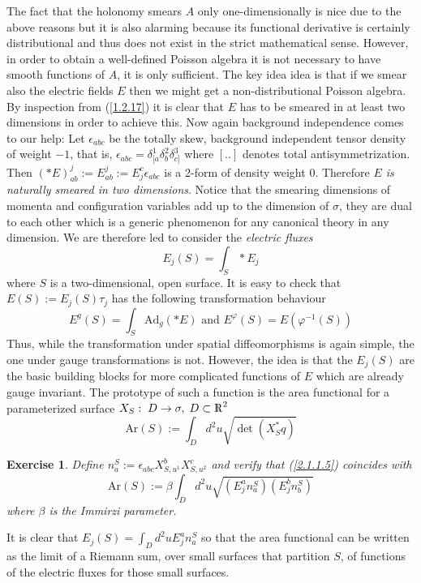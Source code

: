 \documentclass[12pt]{report}
\newtheorem{Exercise}{Exercise}[section]
\def\be{\begin{equation}}
\def\ee{\end{equation}}
\def\Rl{{\mathchoice
{\setbox0=\hbox{$\displaystyle\rm R$}\hbox{\hbox to0pt
{\kern0.4\wd0\vrule height0.9\ht0\hss}\box0}}
{\setbox0=\hbox{$\textstyle\rm R$}\hbox{\hbox to0pt
{\kern0.4\wd0\vrule height0.9\ht0\hss}\box0}}
{\setbox0=\hbox{$\scriptstyle\rm R$}\hbox{\hbox to0pt
{\kern0.4\wd0\vrule height0.9\ht0\hss}\box0}}
{\setbox0=\hbox{$\scriptscriptstyle\rm R$}\hbox{\hbox to0pt
{\kern0.4\wd0\vrule height0.9\ht0\hss}\box0}}}}
\begin{document}
The fact that the holonomy smears $A$ only one-dimensionally is  
nice due to the above reasons but it is also alarming because
its functional derivative is certainly distributional and thus does not
exist in the strict mathematical sense. However, in order to obtain 
a well-defined Poisson algebra it is not necessary to have smooth 
functions of $A$, it is only sufficient. The key idea idea is that
if we smear also the electric fields $E$ then we might get a 
non-distributional Poisson algebra. By inspection from (\ref{1.2.17})
it is clear that $E$ has to be smeared in at least two dimensions 
in order to achieve this. Now again background independence comes to our 
help: Let $\epsilon_{abc}$ be the totally skew, background independent 
tensor density of weight $-1$, that is, 
$\epsilon_{abc}=\delta_{[a}^1\delta_b^2\delta_{c]}^3$ where $[..]$ denotes
total antisymmetrization. Then 
$(\ast E)^j_{ab}:=E^j_{ab}:=E^c_j\epsilon_{abc}$ 
is a 2-form of density weight $0$. Therefore {\it $E$ is naturally 
smeared in two dimensions}.
Notice that the smearing dimensions of momenta and configuration variables 
add up to the dimension of $\sigma$, they are dual to each other which is 
a generic phenomenon for any canonical theory in any dimension.
We are therefore led to consider the {\it electric fluxes}
\be \label{2.1.1.3}
E_j(S)=\int_S \ast E_j
\ee
where $S$ is a two-dimensional, open surface. It is easy to check that
$E(S):=E_j(S)\tau_j$ has the following transformation behaviour
\be \label{2.1.1.4}
E^g(S)=\int_S \mbox{Ad}_g(\ast E) \mbox{ and }
E^\varphi(S)=E(\varphi^{-1}(S))
\ee
Thus, while the transformation under spatial diffeomorphisms is again 
simple, the one under gauge transformations is not. However, the idea 
is that the $E_j(S)$ are the basic building blocks for more complicated 
functions of $E$ which are already gauge invariant. The prototype
of such a function is the area functional for a parameterized
surface $X_S:\; D\to \sigma,\;D\subset \Rl^2$ 
\be \label{2.1.1.5}
\mbox{Ar}(S):=\int_D d^2u \sqrt{\det(X_S^\ast q)}
\ee
%
\begin{Exercise} \label{ex2.1.1.2}
Define $n_a^S:=\epsilon_{abc} X^b_{S,u^1} X^c_{S,u^2}$ and verify that
(\ref{2.1.1.5}) coincides with 
\be \label{ex2.1.1.2a}
\mbox{Ar}(S):=\beta \int_D d^2u \sqrt{(E^a_j n_a^S)(E^b_j n_b^S)}
\ee
where $\beta$ is the Immirzi parameter.
\end{Exercise}
%
It is clear that $E_j(S)=\int_D d^2u E^a_j n_a^S$ so that the area 
functional can be written as the limit of a Riemann sum, over small
surfaces that partition $S$, of functions of the electric fluxes for 
those small surfaces.
\end{document}
